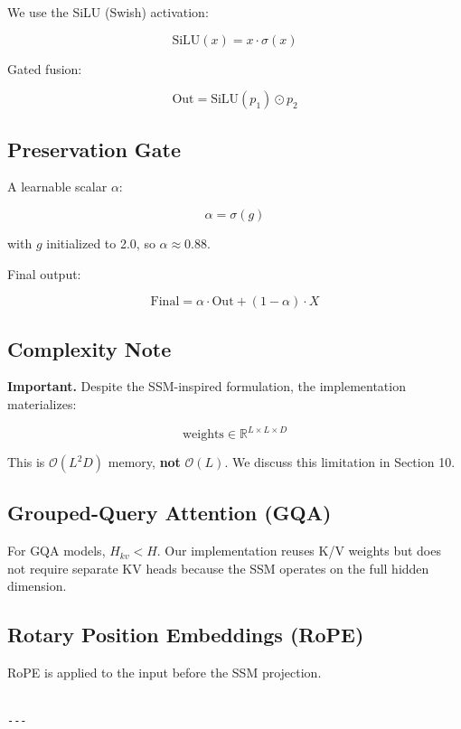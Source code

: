 We use the SiLU (Swish) activation:

\[
\text{SiLU}(x) = x \cdot \sigma(x)
\tag{3.13}
\]

Gated fusion:

\[
\text{Out} = \text{SiLU}(p_1) \odot p_2
\tag{3.14}
\]

\subsection{Preservation Gate}

A learnable scalar $\alpha$:

\[
\alpha = \sigma(g)
\tag{3.15}
\]

with $g$ initialized to 2.0, so $\alpha \approx 0.88$.

Final output:

\[
\text{Final} = \alpha \cdot \text{Out} + (1 - \alpha) \cdot X
\tag{3.16}
\]

\subsection{Complexity Note}

\textbf{Important.} Despite the SSM-inspired formulation, the implementation 
materializes:

\[
\text{weights} \in \mathbb{R}^{L \times L \times D}
\tag{3.17}
\]

This is $\mathcal{O}(L^2 D)$ memory, \textbf{not} $\mathcal{O}(L)$. We discuss 
this limitation in Section 10.

\subsection{Grouped-Query Attention (GQA)}

For GQA models, $H_{kv} < H$. Our implementation reuses K/V weights but 
does not require separate KV heads because the SSM operates on the full 
hidden dimension.

\subsection{Rotary Position Embeddings (RoPE)}

RoPE is applied to the input before the SSM projection.
\begin{lstlisting}

---
\end{lstlisting}